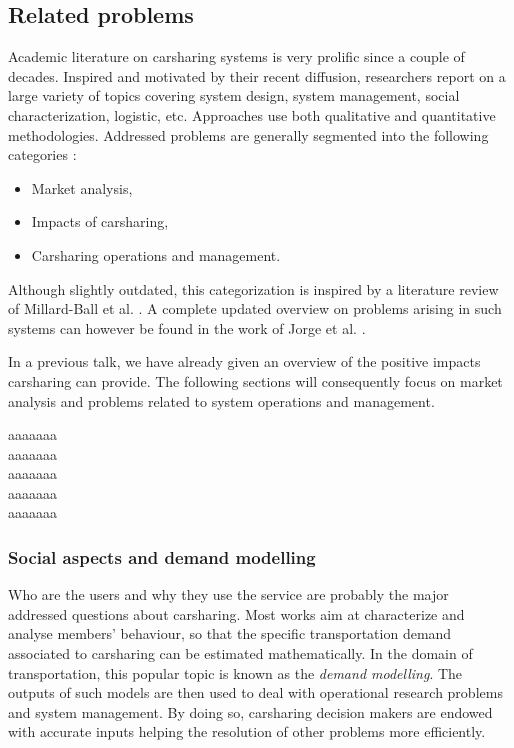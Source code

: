 \begin{bibunit}[ieeetr]
\newpage
\subsection{Related problems}

Academic literature on carsharing systems is very prolific since a couple of decades.
Inspired and motivated by their recent diffusion, researchers report on a large variety of topics covering system design, system management, social characterization, logistic, etc.
Approaches use both qualitative and quantitative methodologies.
Addressed problems are generally segmented into the following categories \cite{ciari_sharing_2012}:
\begin{itemize}
\item Market analysis,
\item Impacts of carsharing,
\item Carsharing operations and management.
\end{itemize}

Although slightly outdated, this categorization is inspired by a literature review of Millard-Ball et al. \cite{millard_ball_car_sharing_2005}.
A complete updated overview on problems arising in such systems can however be found in the work of Jorge et al. \cite{jorge_carsharing_2013}.

\medskip
In a previous talk, we have already given an overview of the positive impacts carsharing can provide.
The following sections will consequently focus on market analysis and problems related to system operations and management.

\medskip
aaaaaaa\\
aaaaaaa\\
aaaaaaa\\
aaaaaaa\\
aaaaaaa\\


\subsubsection{Social aspects and demand modelling}
Who are the users and why they use the service are probably the major addressed questions about carsharing.
Most works aim at characterize and analyse members' behaviour, so that the specific transportation demand associated to carsharing can be estimated mathematically.
In the domain of transportation, this popular topic is known as the \emph{demand modelling}.
The outputs of such models are then used to deal with operational research problems and system management.
By doing so, carsharing decision makers are endowed with accurate inputs helping the resolution of other problems more efficiently.


\end{bibunit}
